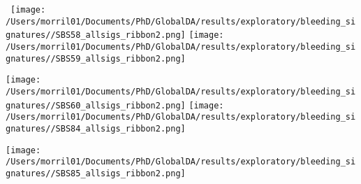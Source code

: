 \documentclass{article}
\begin{document}
\hspace{-1in}\ \texttt{[image: /Users/morril01/Documents/PhD/GlobalDA/results/exploratory/bleeding\_signatures//SBS58\_allsigs\_ribbon2.png]} \texttt{[image: /Users/morril01/Documents/PhD/GlobalDA/results/exploratory/bleeding\_signatures//SBS59\_allsigs\_ribbon2.png]}

\hspace{-1in} \texttt{[image: /Users/morril01/Documents/PhD/GlobalDA/results/exploratory/bleeding\_signatures//SBS60\_allsigs\_ribbon2.png]}  \texttt{[image: /Users/morril01/Documents/PhD/GlobalDA/results/exploratory/bleeding\_signatures//SBS84\_allsigs\_ribbon2.png]} 

\hspace{-1in}\texttt{[image: /Users/morril01/Documents/PhD/GlobalDA/results/exploratory/bleeding\_signatures//SBS85\_allsigs\_ribbon2.png]} 
\end{document}

